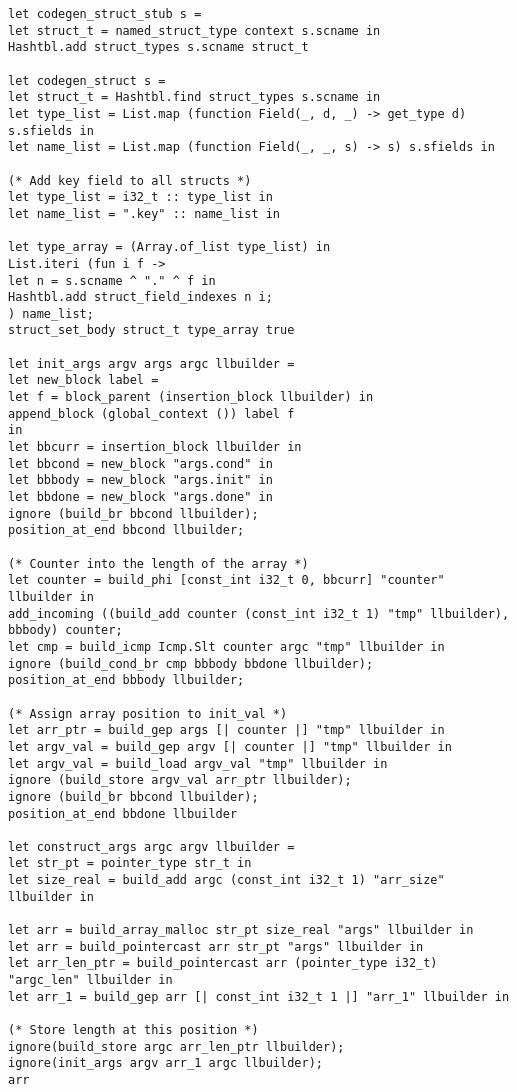 \begin{verbatim}
let codegen_struct_stub s =
let struct_t = named_struct_type context s.scname in
Hashtbl.add struct_types s.scname struct_t

let codegen_struct s = 
let struct_t = Hashtbl.find struct_types s.scname in
let type_list = List.map (function Field(_, d, _) -> get_type d) s.sfields in
let name_list = List.map (function Field(_, _, s) -> s) s.sfields in

(* Add key field to all structs *)
let type_list = i32_t :: type_list in
let name_list = ".key" :: name_list in

let type_array = (Array.of_list type_list) in
List.iteri (fun i f ->
let n = s.scname ^ "." ^ f in
Hashtbl.add struct_field_indexes n i;
) name_list;
struct_set_body struct_t type_array true

let init_args argv args argc llbuilder =
let new_block label =
let f = block_parent (insertion_block llbuilder) in
append_block (global_context ()) label f
in
let bbcurr = insertion_block llbuilder in
let bbcond = new_block "args.cond" in
let bbbody = new_block "args.init" in
let bbdone = new_block "args.done" in
ignore (build_br bbcond llbuilder);
position_at_end bbcond llbuilder;

(* Counter into the length of the array *)
let counter = build_phi [const_int i32_t 0, bbcurr] "counter" llbuilder in
add_incoming ((build_add counter (const_int i32_t 1) "tmp" llbuilder), bbbody) counter;
let cmp = build_icmp Icmp.Slt counter argc "tmp" llbuilder in
ignore (build_cond_br cmp bbbody bbdone llbuilder);
position_at_end bbbody llbuilder;

(* Assign array position to init_val *)
let arr_ptr = build_gep args [| counter |] "tmp" llbuilder in
let argv_val = build_gep argv [| counter |] "tmp" llbuilder in
let argv_val = build_load argv_val "tmp" llbuilder in
ignore (build_store argv_val arr_ptr llbuilder);
ignore (build_br bbcond llbuilder);
position_at_end bbdone llbuilder

let construct_args argc argv llbuilder = 
let str_pt = pointer_type str_t in
let size_real = build_add argc (const_int i32_t 1) "arr_size" llbuilder in

let arr = build_array_malloc str_pt size_real "args" llbuilder in
let arr = build_pointercast arr str_pt "args" llbuilder in
let arr_len_ptr = build_pointercast arr (pointer_type i32_t) "argc_len" llbuilder in
let arr_1 = build_gep arr [| const_int i32_t 1 |] "arr_1" llbuilder in

(* Store length at this position *)
ignore(build_store argc arr_len_ptr llbuilder); 
ignore(init_args argv arr_1 argc llbuilder);
arr


\end{verbatim}
